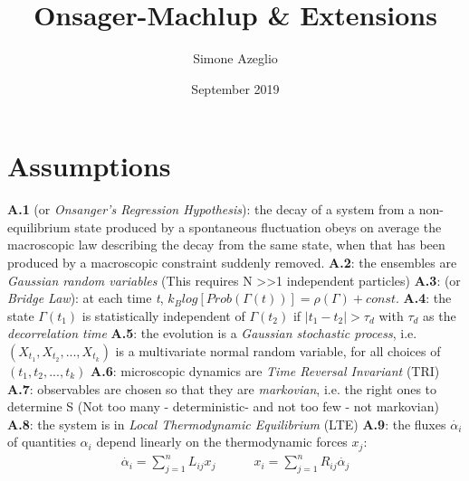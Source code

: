 \documentclass{article}
\title{Onsager-Machlup \& Extensions}
\author{Simone Azeglio}
\date{September 2019}
\begin{document}
 
\maketitle

\section{Assumptions}
\textbf{A.1} (or \textit{Onsanger's Regression Hypothesis}): the decay of a system from a non-equilibrium state produced by a spontaneous fluctuation obeys on average the macroscopic law describing the decay from the same state, when that has been produced by a macroscopic constraint suddenly removed. 
\newline 
\newline 
\textbf{A.2}: the ensembles are \textit{Gaussian random variables} (This requires N \textgreater \textgreater 1 independent particles)
\newline 
\newline 
\textbf{A.3}: (or \textit{Bridge Law}): at each time  \textit{t}, $k_B log[Prob(\Gamma(t))] = \rho(\Gamma) + const$.
\newline 
\newline 
\textbf{A.4}: the state  $\Gamma(t_1)$ is statistically independent of $\Gamma(t_2)$ if $|t_1 - t_2| > \tau_d$ with $\tau_d$ as the \textit{decorrelation time}
\newline 
\newline 
\textbf{A.5}: the evolution is a \textit{Gaussian stochastic process}, i.e. $(X_{t_1}, X_{t_2},..., X_{t_k})$ is a multivariate normal random variable, for all choices of $(t_1, t_2, ..., t_k)$
\newline 
\newline 
\textbf{A.6}: microscopic dynamics are \textit{Time Reversal Invariant} (TRI)
\newline 
\newline 
\textbf{A.7}: observables are chosen so that they are \textit{markovian}, i.e. the right ones to determine S (Not too many - deterministic- and not too few - not markovian)
\newline 
\newline 
\textbf{A.8}: the system is in \textit{Local Thermodynamic Equilibrium} (LTE) 
\newline 
\newline 
\textbf{A.9}: the fluxes $\dot{\alpha_i}$ of quantities $\alpha_{i}$ depend linearly on the thermodynamic forces $x_{j}$:
\begin{align*}
\dot{\alpha_i} = \sum_{j = 1}^{n}L_{ij}x_j 
\quad\quad\quad
x_i = \sum_{j=1}^{n}R_{ij}\dot{\alpha_j}
\end{align*}
\end{document}

